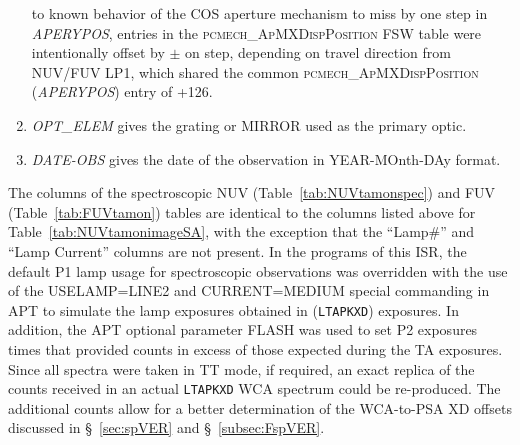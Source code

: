 \begin{enumerate}
{to known behavior of the COS aperture mechanism to miss by one step in \textit{APERYPOS}, entries in the \textsc{pcmech\_ApMXDispPosition} FSW table were intentionally offset by $\pm$ on step, depending on travel direction from NUV/FUV LP1, which
shared the common \textsc{pcmech\_ApMXDispPosition} (\textit{APERYPOS}) entry of +126.}
\item \textit{OPT\_ELEM} gives the grating or MIRROR used as the primary optic.
\item \textit{DATE-OBS} gives the date of the observation in YEAR-MOnth-DAy format.
\end{enumerate}
\normalsize

The columns of the spectroscopic NUV (Table~\ref{tab:NUVtamonspec}) and FUV (Table~\ref{tab:FUVtamon})
tables are identical to the columns listed above for Table~\ref{tab:NUVtamonimageSA}, with the exception that
the ``Lamp\#''  and ``Lamp Current'' columns are not present. In the programs of this ISR,
the default P1 lamp usage for spectroscopic observations was overridden with the use of the \textsc{USELAMP=LINE2} and \textsc{CURRENT=MEDIUM} special commanding
in APT to simulate the lamp exposures obtained in \numposone {} (\texttt{LTAPKXD}) exposures.
In addition, the APT optional parameter \textsc{FLASH} was used to set P2 exposures times that
provided counts in excess of those expected during the TA exposures.  Since all spectra were taken in TT mode,
if required, an exact replica of the counts received in an actual \texttt{LTAPKXD} WCA spectrum could be re-produced.
The additional counts allow for a better determination of the WCA-to-PSA XD offsets discussed in \S~\ref{sec:spVER} and \S~\ref{subsec:FspVER}.
\normalsize



